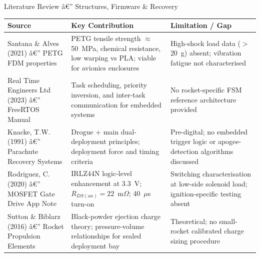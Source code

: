 \documentclass[aspectratio=169, 11pt]{beamer}
\begin{document}
\begin{frame}[shrink=5]{Literature Review â€” Structures, Firmware \& Recovery}
\small
\begin{tabular}{@{}p{2.8cm}p{4.6cm}p{4.0cm}@{}}
  \toprule
  \textbf{Source} & \textbf{Key Contribution} & \textbf{Limitation / Gap}\\
  \midrule
  Santana \& Alves (2021) â€” PETG FDM properties &
    PETG tensile strength $\approx$50~MPa, chemical resistance, low warping vs PLA; viable for avionics enclosures &
    High-shock load data ($>$20~g) absent; vibration fatigue not characterised \\[4pt]

  Real Time Engineers Ltd (2023) â€” FreeRTOS Manual &
    Task scheduling, priority inversion, and inter-task communication for embedded systems &
    No rocket-specific FSM reference architecture provided \\[4pt]

  Knacke, T.W. (1991) â€” Parachute Recovery Systems &
    Drogue + main dual-deployment principles; deployment force and timing criteria &
    Pre-digital; no embedded trigger logic or apogee-detection algorithms discussed \\[4pt]

  Rodriguez, C. (2020) â€” MOSFET Gate Drive App Note &
    IRLZ44N logic-level enhancement at 3.3~V; $R_{DS(on)}=22$~m$\Omega$; 40~$\mu$s turn-on &
    Switching characterisation at low-side solenoid load; ignition-specific testing absent \\[4pt]

  Sutton \& Biblarz (2016) â€” Rocket Propulsion Elements &
    Black-powder ejection charge theory; pressure-volume relationships for sealed deployment bay &
    Theoretical; no small-rocket calibrated charge sizing procedure \\
  \bottomrule
\end{tabular}
\end{frame}
\end{document}
